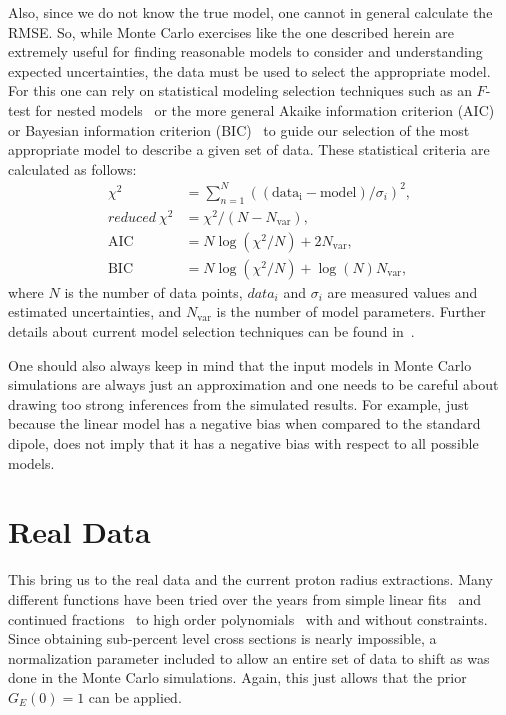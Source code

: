 \documentclass[10pt,aps,prc,twocolumn]{revtex4-1}
\begin{document}
Also, since we do not know the true model, one cannot in general calculate the RMSE. So, while Monte Carlo exercises 
like the one described herein are extremely useful for finding reasonable models to consider and understanding
expected uncertainties, the data must be used to select the appropriate model. 
For this one can rely on statistical modeling selection techniques such as an $F$-test for
nested models~\cite{Bevington:2003,James:2006,Sirca:2016} or the more general Akaike information criterion (AIC)~\cite{Akaike:1974} 
or Bayesian information criterion (BIC)~\cite{Schwarz:1978} 
to guide our selection of the most appropriate model to describe a given set of data.
These statistical criteria are calculated as follows: 
\begin{align}
\chi^2         & = \sum_{n=1}^{N}((\mathrm{data_i} - \mathrm{model}) / \sigma_i)^2, \\
reduced~\chi^2 & = \chi^2/ (N - N_{\mathrm{var}}),  \\
\mathrm{AIC}            & = N \log(\chi^2/N) + 2 N_{\mathrm{var}}, \\
\mathrm{BIC}            & = N \log(\chi^2/N) + \log(N) N_{\mathrm{var}},
\end{align}
where $N$ is the number of data points, $data_i$ and $\sigma_i$ are measured values and estimated uncertainties,
and $N_{\mathrm{var}}$ is the number of model parameters.
Further details about current model selection techniques can be found in~\cite{Ernst:2012}.

One should also always keep in mind that the input models in Monte Carlo simulations are always just an approximation
and one needs to be careful about drawing too strong inferences from the simulated results. 
For example, just because the linear model has a negative bias when compared to the standard dipole, 
does not imply that it has a negative bias with respect to all possible models.


\section{Real Data}

This bring us to the real data and the current proton radius extractions.   Many different functions have
been tried over the years from simple linear fits~\cite{Hand:1963zz,Murphy:1974zz} and continued fractions~\cite{Sick:2003gm} 
to high order polynomials~\cite{Bernauer:2013tpr,Lee:2015jqa} with and without constraints.   Since obtaining sub-percent
level cross sections is nearly impossible, a normalization parameter included to allow an entire set of data to shift
as was done in the Monte Carlo simulations.   Again, this just allows that the prior $G_E(0)=1$ can be applied.
\end{document}
